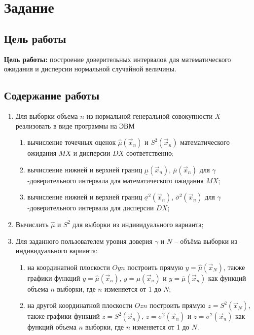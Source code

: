 \chapter{Задание}
\section{Цель работы}
\textbf{Цель работы:} построение доверительных интервалов для математического ожидания и дисперсии нормальной случайной величины.
\section{Содержание работы}
\begin{enumerate}
	\item Для выборки объема $n$ из нормальной генеральной совокупности $X$ реализовать в виде программы на ЭВМ
	\begin{enumerate}
		\item вычисление точечных оценок $\hat\mu(\vec x_n)$ и $S^2(\vec x_n)$ математического ожидания $MX$ и дисперсии $DX$ соответственно;
		\item вычисление нижней и верхней границ $\underline\mu(\vec x_n)$, $\overline\mu(\vec x_n)$ для \newline $\gamma$-доверительного интервала для математического ожидания $MX$;
		\item вычисление нижней и верхней границ $\underline\sigma^2(\vec x_n)$, $\overline\sigma^2(\vec x_n)$ для \newline $\gamma$-доверительного интервала для дисперсии $DX$;
	\end{enumerate}
	\item Вычислить $\hat\mu$ и $S^2$ для выборки из индивидуального варианта;
	\item Для заданного пользователем уровня доверия $\gamma$ и $N$ – объёма выборки из индивидуального варианта:
	\begin{enumerate}
		\item на координатной плоскости $Oyn$ построить прямую $y = \hat\mu(\vec x_{N})$, также графики функций $y = \hat\mu(\vec x_n)$, $y = \underline\mu(\vec x_n)$ и $y = \overline\mu(\vec x_n)$ как функций объема $n$ выборки, где $n$ изменяется от 1 до $N$;
		\item на другой координатной плоскости $Ozn$ построить прямую \newline $z = S^2(\vec x_N)$, также графики функций $z = S^2(\vec x_n)$, $z = \underline\sigma^2(\vec x_n)$ и $z = \overline\sigma^2(\vec x_n)$ как функций объема $n$ выборки, где $n$ изменяется \newline от 1 до $N$.
	\end{enumerate}
\end{enumerate}